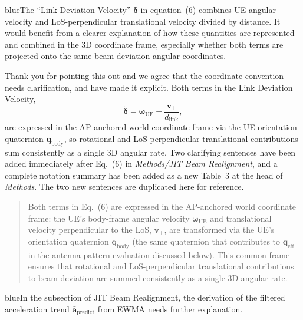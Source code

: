 \documentclass{article}
\newcommand{\blue}[1]{\begin{color}{blue}#1\end{color}}
\begin{document}
\begin{tcbremark}
{\selectfont
\blue{The ``Link Deviation Velocity'' $\dot{\boldsymbol\delta}$ in equation~(6) combines UE angular velocity and LoS-perpendicular translational velocity divided by distance. It would benefit from a clearer explanation of how these quantities are represented and combined in the 3D coordinate frame, especially whether both terms are projected onto the same beam-deviation angular coordinates.}
}
\end{tcbremark}

\noindent Thank you for pointing this out and we agree that the coordinate convention needs clarification, and have made it explicit. Both terms in the Link Deviation Velocity,
\begin{equation}
    \dot{\boldsymbol{\delta}} = \boldsymbol{\omega}_{\text{UE}} + \frac{\mathbf{v}_{\perp}}{d_{\text{link}}}, \tag{Eq.~6}
\end{equation}
are expressed in the AP-anchored world coordinate frame via the UE orientation quaternion $\mathbf{q}_{\text{body}}$, so rotational and LoS-perpendicular translational contributions sum consistently as a single 3D angular rate. Two clarifying sentences have been added immediately after Eq.~(6) in \emph{Methods/JIT Beam Realignment}, and a complete notation summary has been added as a new Table~3 at the head of \emph{Methods}. The two new sentences are duplicated here for reference.

\begin{quote}
{\color{cyan!75!black}
Both terms in Eq.~(6) are expressed in the AP-anchored world coordinate frame: the UE's body-frame angular velocity $\boldsymbol{\omega}_{\text{UE}}$ and translational velocity perpendicular to the LoS, $\mathbf{v}_{\perp}$, are transformed via the UE's orientation quaternion $\mathbf{q}_{\text{body}}$ (the same quaternion that contributes to $\mathbf{q}_{\text{eff}}$ in the antenna pattern evaluation discussed below). This common frame ensures that rotational and LoS-perpendicular translational contributions to beam deviation are summed consistently as a single 3D angular rate.
}
\end{quote}

\begin{tcbremark}
{\selectfont
\blue{In the subsection of JIT Beam Realignment, the derivation of the filtered acceleration trend $\bar{\mathbf{a}}_{\text{predict}}$ from EWMA needs further explanation.}
}
\end{tcbremark}
\end{document}
